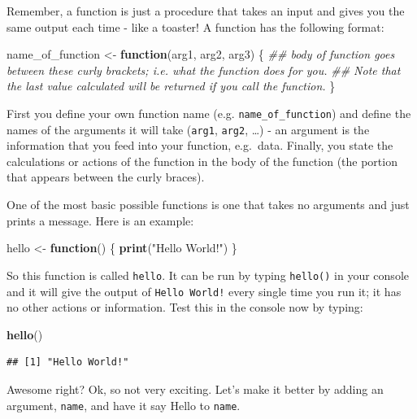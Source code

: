 \documentclass[]{book}
\newenvironment{Shaded}{\begin{snugshade}}{\end{snugshade}}
\newcommand{\CommentTok}[1]{\textcolor[rgb]{0.56,0.35,0.01}{\textit{#1}}}
\newcommand{\ControlFlowTok}[1]{\textcolor[rgb]{0.13,0.29,0.53}{\textbf{#1}}}
\newcommand{\KeywordTok}[1]{\textcolor[rgb]{0.13,0.29,0.53}{\textbf{#1}}}
\newcommand{\NormalTok}[1]{#1}
\newcommand{\StringTok}[1]{\textcolor[rgb]{0.31,0.60,0.02}{#1}}
\begin{document}
Remember, a function is just a procedure that takes an input and gives you the same output each time - like a toaster! A function has the following format:

\begin{Shaded}
\begin{Highlighting}[]
\NormalTok{name_of_function <-}\StringTok{ }\ControlFlowTok{function}\NormalTok{(arg1, arg2, arg3) \{}
  \CommentTok{## body of function goes between these curly brackets; i.e. what the function does for you.}
  \CommentTok{## Note that the last value calculated will be returned if you call the function.}
\NormalTok{\}}
\end{Highlighting}
\end{Shaded}

First you define your own function name (e.g. \texttt{name\_of\_function}) and define the names of the arguments it will take (\texttt{arg1}, \texttt{arg2}, \ldots{}) - an argument is the information that you feed into your function, e.g.~data. Finally, you state the calculations or actions of the function in the body of the function (the portion that appears between the curly braces).

One of the most basic possible functions is one that takes no arguments and just prints a message. Here is an example:

\begin{Shaded}
\begin{Highlighting}[]
\NormalTok{hello <-}\StringTok{ }\ControlFlowTok{function}\NormalTok{() \{}
  \KeywordTok{print}\NormalTok{(}\StringTok{"Hello World!"}\NormalTok{)}
\NormalTok{\}}
\end{Highlighting}
\end{Shaded}

So this function is called \texttt{hello}. It can be run by typing \texttt{hello()} in your console and it will give the output of \texttt{Hello\ World!} every single time you run it; it has no other actions or information. Test this in the console now by typing:

\begin{Shaded}
\begin{Highlighting}[]
\KeywordTok{hello}\NormalTok{()}
\end{Highlighting}
\end{Shaded}

\begin{verbatim}
## [1] "Hello World!"
\end{verbatim}

Awesome right? Ok, so not very exciting. Let's make it better by adding an argument, \texttt{name}, and have it say Hello to \texttt{name}.
\end{document}

